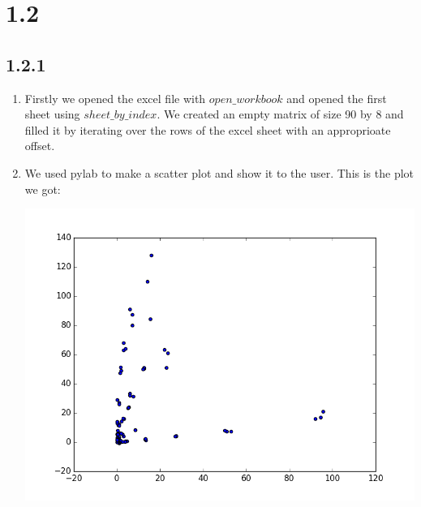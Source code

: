 \documentclass[12pt]{article}
\begin{document}
\section*{1.2}
\subsection*{1.2.1}
\begin{enumerate}[a]
	\item %
	Firstly we opened the excel file with $open\_workbook$ and opened the first sheet using $sheet\_by\_index$. We created an empty matrix of size 90 by 8 and filled it by iterating over the rows of the excel sheet with an approprioate offset.

	\item %
	We used pylab to make a scatter plot and show it to the user. This is the plot we got:

	\includegraphics[width=\textwidth]{plot_1_2_1-b}
\end{enumerate}
\end{document}
